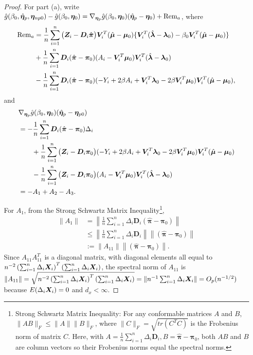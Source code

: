 \documentclass[12pt]{article}
\begin{document}
{\begin{proof}
For part (a), write $ 	 \hat 	g( \beta_0, \hat {\bm \eta}_{p},  \bm \eta_{np0})  -\hat g(\beta_0, \bm \eta_0) = \nabla_{\bm \eta_{p}} \hat g(\beta_0, \bm \eta_0) (\hat {\bm \eta}_{p}- \bm \eta_0) + \text{Rem}_a   $, where 
\begin{align*}
	\text{Rem}_a&= \frac{1}{n} \sum_{i=1}^{n}  \big( \bm{Z}_i-\bm D_i \hat{ \bm\pi} \big)  \bm{V}_i^T(\hat{\bm\mu} - \bm \mu_0 )  \{  \bm{V}_i^T(\hat{\bm\lambda} - \bm\lambda_0 )  -  \beta_0 \bm{V}_i^T(\hat{\bm\mu} - \bm \mu_0 ) \}
	\\
	&+ 	\frac{1}{n} \sum_{i=1}^{n} \bm D_i (\hat{ \bm\pi} - \bm\pi_0) (A_i - \bm{V}_i^T \bm\mu_0 ) \bm{V}_i^T (\hat{\bm \lambda}- \bm\lambda_0 ) \\
	&-	\frac{1}{n} \sum_{i=1}^{n}\bm D_i (\hat{ \bm\pi} - \bm\pi_0)   (- Y_i + 2\beta A_i + \bm{V}_i^T \bm\lambda_0 - 2\beta\bm{V}_i^T \bm\mu_0  ) \bm{V}_i^T (\hat{\bm\mu}- \bm\mu_0 ),
\end{align*}
and
\begin{align*}
	&  \nabla_{\bm \eta_{p}} \hat g(\beta_0, \bm \eta_0)(\hat {\bm \eta}_{p}- \bm \eta_{p0})  \\
	& = - \frac{1}{n}  \sum_{i=1}^{n}	
	\bm D_i (\hat{\bm \pi} - \bm \pi_0) \Delta_i   \\
	  &\qquad +  \frac{1}{n} \sum_{i=1}^{n}\big( \bm{Z}_i-\bm D_i \bm\pi_0 \big)   ( - Y_i + 2\beta A_i +\bm{V}_i^T \bm{\lambda}_{0} - 2\beta \bm{V}_i^T \bm{\mu}_{0}  )    \bm{V}_i^T ( \hat{\bm{\mu}} - \bm{\mu}_{0})   \\
	  &\qquad- \frac{1}{n} \sum_{i=1}^{n}\big( \bm{Z}_i-\bm D_i \bm\pi_0 \big) (A_i - \bm{V}_i^T \bm{\mu}_{0} ) \bm{V}_i^T ( \hat{\bm{\lambda}}- \bm{\lambda}_{0}  ) 
	 \\
	  &= - A_1+ A_2-  A_3.
\end{align*}

For $ A_1$, from the Strong Schwartz Matrix Inequality\footnote{Strong Schwartz Matrix Inequality: For any conformable matrices $ A $ and $ B $, $ \|AB\|_F\leq \|A\| \|B\|_F $, where $ \|C\|_F = \sqrt{tr(C^TC)}$ is the Frobenius norm of matrix $ C $. Here, with $ A= \frac{1}{n} \sum_{i=1}^{n}  
	\Delta_i   \bm D_i , B= \hat{\bm \pi} - \bm \pi_0	  $, both $ AB $ and $ B $ are column vectors so their Frobenius norms equal the spectral norms. },
\begin{align*}
	\|A_1 \| &= \left\| \frac{1}{n} \sum_{i=1}^{n}  
	 \Delta_i   \bm D_i (\hat{\bm \pi} - \bm \pi_0)
	 \right\| \\
	 & \leq 
	  \left\| \frac{1}{n} \sum_{i=1}^{n}  
	 \Delta_i   \bm D_i 	 \right\| 
 	\left\|
(\hat{\bm \pi} - \bm \pi_0)
	 \right\|\\
	 &:=  \|A_{11} \| 	\left\|
	 (\hat{\bm \pi} - \bm \pi_0)
	 \right\|.
\end{align*}
Since $ A_{11} A_{11}^T  $ is a diagonal matrix, with diagonal elements all equal to 
$n^{-2} \left( \sum_{i=1}^{n} \Delta_i \bm{X}_i \right)^T  \left( \sum_{i=1}^{n} \Delta_i \bm{X}_i \right) $, the spectral norm of $ A_{11} $ is 
 $ \|A_{11}\| =  \sqrt{ n^{-2} \left( \sum_{i=1}^{n} \Delta_i \bm{X}_i \right)^T  \left( \sum_{i=1}^{n} \Delta_i \bm{X}_i \right)  }= \|n^{-1}  \sum_{i=1}^{n} \Delta_i \bm{X}_i   \| = O_p(n^{-1/2})$ because $ E(\Delta_i \bm{X}_i)= 0 $ and $ d_x<\infty $. 
 

\end{proof}}
\end{document}
